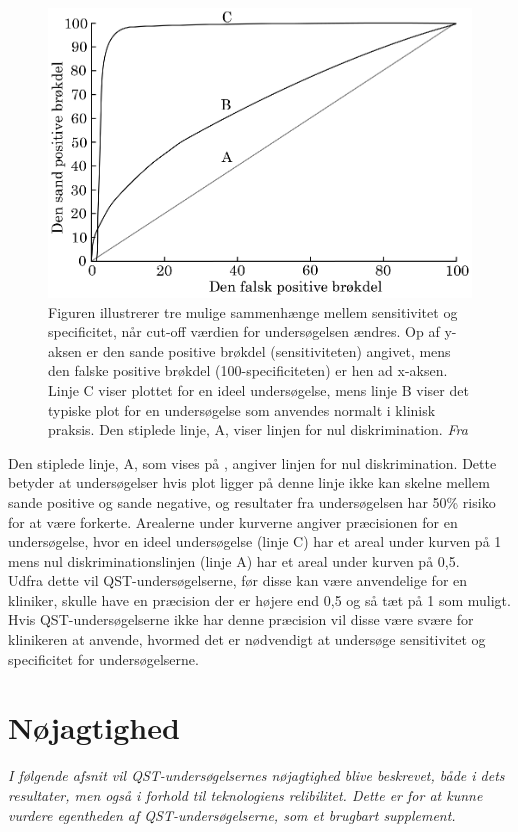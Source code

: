 \begin{figure}[H]
\centering
\includegraphics[width=\textwidth]{figures/dHTAanalyse/AUC}
\caption{Figuren illustrerer tre mulige sammenhænge mellem sensitivitet og specificitet, når cut-off værdien for undersøgelsen ændres. Op af y-aksen er den sande positive brøkdel (sensitiviteten) angivet, mens den falske positive brøkdel (100-specificiteten) er hen ad x-aksen. Linje C viser plottet for en ideel undersøgelse, mens linje B viser det typiske plot for en undersøgelse som anvendes normalt i klinisk praksis. Den stiplede linje, A, viser linjen for nul diskrimination. \textit{Fra }}\label{fig:AUC}
\end{figure}

Den stiplede linje, A, som vises på , angiver linjen for nul diskrimination. Dette betyder at undersøgelser hvis plot ligger på denne linje ikke kan skelne mellem sande positive og sande negative, og resultater fra undersøgelsen har 50\% risiko for at være forkerte. Arealerne under kurverne angiver præcisionen for en undersøgelse, hvor en ideel undersøgelse (linje C) har et areal under kurven på 1 mens nul diskriminationslinjen (linje A) har et areal under kurven på 0,5. \\
Udfra dette vil QST-undersøgelserne, før disse kan være anvendelige for en kliniker, skulle have en præcision der er højere end 0,5 og så tæt på 1 som muligt. Hvis QST-undersøgelserne ikke har denne præcision vil disse være svære for klinikeren at anvende, hvormed det er nødvendigt at undersøge sensitivitet og specificitet for undersøgelserne.   

\section{Nøjagtighed}
\textit{I følgende afsnit vil QST-undersøgelsernes nøjagtighed blive beskrevet, både i dets resultater, men også i forhold til teknologiens relibilitet. Dette er for at kunne vurdere egentheden af QST-undersøgelserne, som et brugbart supplement.}

